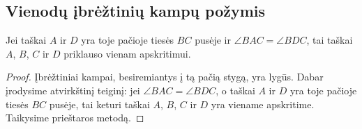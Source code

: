 \documentclass[11pt,a4paper]{scrartcl}
\begin{document}
\subsection{Vienodų įbrėžtinių kampų požymis}
\begin{proposition}
Jei taškai $A$ ir $D$ yra toje pačioje tiesės $BC$ pusėje ir $\angle BAC=\angle BDC$, tai taškai $A$, $B$, $C$ ir $D$ priklauso vienam apskritimui.
\end{proposition}
\begin{proof}
Įbrėžtiniai kampai, besiremiantys į tą pačią stygą, yra lygūs. Dabar įrodysime atvirkštinį teiginį: jei $\angle BAC=\angle BDC$, o taškai $A$ ir $D$ yra toje pačioje tiesės $BC$ pusėje, tai keturi taškai $A$, $B$, $C$ ir $D$ yra viename apskritime. Taikysime prieštaros metodą.


\end{proof}
\end{document}
